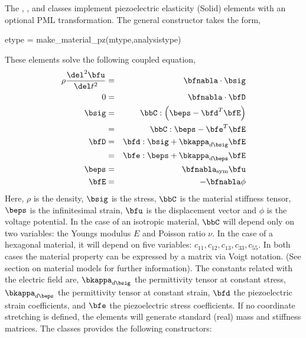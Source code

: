 The , , 
and 
classes implement piezoelectric elasticity (Solid) elements with an 
optional PML transformation. 
The general constructor takes the form,
\begin{codelist}
  \item[etype = make\_material\_pz(mtype,analysistype)]
\end{codelist}
These elements solve the following 
coupled equation,
\begin{eqnarray}
\rho \frac{\del^2 \bfu}{\del t^2}
&=& \bfnabla\cdot\bsig \\
0
&=& \bfnabla\cdot\bfD \\
\bsig &=& \bbC:\left(\beps - \bfd^T\bfE \right)\\
      &=& \bbC:\beps - \bfe^T\bfE \\
\bfD  &=& \bfd:\bsig + \bkappa_{d\bsig}\bfE \\
      &=& \bfe:\beps + \bkappa_{d\beps}\bfE \\
\beps &=& \bfnabla_\text{sym}\bfu \\
\bfE  &=&-\bfnabla\phi
\end{eqnarray}
Here, $\rho$ is the density, $\bsig$ is the stress, $\bbC$ is the
material stiffness tensor, $\beps$ is the infinitesimal strain, 
$\bfu$ is the displacement vector and $\phi$ is the voltage potential.
In the case of an isotropic material,
$\bbC$ will depend only on two variables: the Youngs modulus $E$ and 
Poisson ratio $\nu$. In the case of a hexagonal material, it will depend
on five variables: $c_{11},c_{12},c_{13},c_{33},c_{55}$.  In both cases 
the material property can be expressed by a matrix via Voigt notation. 
(See section on material models for further information). The constants
related with the electric field are, $\bkappa_{d\bsig}$ the permittivity
tensor at constant stress, $\bkappa_{d\beps}$ the permittivity tensor
at constant strain, $\bfd$ the piezoelectric strain coefficients,
and $\bfe$ the piezoelectric stress coefficients. 
If no coordinate stretching is defined, the elements will generate 
standard (real) mass and stiffness matrices.
The classes provides the following constructors:
